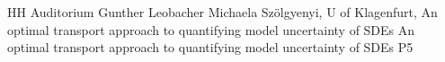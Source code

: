 {HH Auditorium}	%
{Gunther Leobacher}		%
{Michaela Szölgyenyi, U of Klagenfurt, An optimal transport approach to quantifying model uncertainty of SDEs}	%
{An optimal transport approach to quantifying model uncertainty of SDEs}		%
{P5}		%
\\\hline
